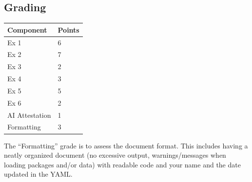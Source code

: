 \documentclass[
  letterpaper,
  DIV=11,
  numbers=noendperiod]{scrartcl}
\newcounter{none} %
\begin{document}
\subsection{Grading}\label{grading}

{\def\LTcaptype{none} %
\begin{longtable}[]{@{}ll@{}}
\toprule\noalign{}
Component & Points \\
\midrule\noalign{}
\endhead
\bottomrule\noalign{}
\endlastfoot
Ex 1 & 6 \\
Ex 2 & 7 \\
Ex 3 & 2 \\
Ex 4 & 3 \\
Ex 5 & 5 \\
Ex 6 & 2 \\
AI Attestation & 1 \\
Formatting & 3 \\
\end{longtable}
}

The ``Formatting'' grade is to assess the document format. This includes
having a neatly organized document (no excessive output,
warnings/messages when loading packages and/or data) with readable code
and your name and the date updated in the YAML.
\end{document}
